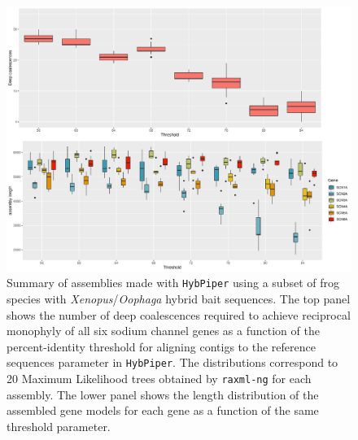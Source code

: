 \documentclass{article}
\begin{document}
\begin{figure}[h!]
    \centering
    \includegraphics[scale=0.5]{figures/summary_alignments_xenPum_ref_orig.pdf}
    \caption{Summary of assemblies made with \texttt{HybPiper} using a subset of frog species with \textit{Xenopus}/\textit{Oophaga} hybrid bait sequences. The top panel shows the number of deep coalescences required to achieve reciprocal monophyly of all six sodium channel genes as a function of the percent-identity threshold for aligning contigs to the reference sequences parameter in \texttt{HybPiper}. The distributions correspond to 20 Maximum Likelihood trees obtained by \texttt{raxml-ng} for each assembly. The lower panel shows the length distribution of the assembled gene models for each gene as a function of the same threshold parameter.}
    \label{fig:my_label}
\end{figure}
\clearpage
\end{document}
